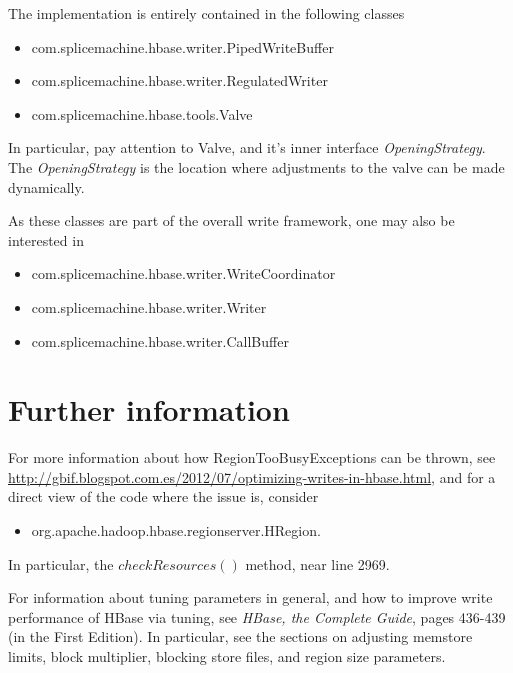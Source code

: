 \documentclass[11pt]{article}
\begin{document}
The implementation is entirely contained in the following classes

\begin{itemize}
\item com.splicemachine.hbase.writer.PipedWriteBuffer
\item com.splicemachine.hbase.writer.RegulatedWriter
\item com.splicemachine.hbase.tools.Valve
\end{itemize}

In particular, pay attention to Valve, and it's inner interface \emph{OpeningStrategy}. The \emph{OpeningStrategy} is the location where adjustments to the valve
can be made dynamically.

As these classes are part of the overall write framework, one may also be interested in 

\begin{itemize}
\item com.splicemachine.hbase.writer.WriteCoordinator
\item com.splicemachine.hbase.writer.Writer
\item com.splicemachine.hbase.writer.CallBuffer
\end{itemize}

\section{Further information}

For more information about how RegionTooBusyExceptions can be thrown, see \url{http://gbif.blogspot.com.es/2012/07/optimizing-writes-in-hbase.html}, and for
a direct view of the code where the issue is, consider 

\begin{itemize}
\item org.apache.hadoop.hbase.regionserver.HRegion.
\end{itemize}

In particular, the $checkResources()$ method, near line 2969.

For information about tuning parameters in general, and how to improve write performance of HBase via tuning, see \emph{HBase, the Complete Guide}, pages 
436-439 (in the First Edition). In particular, see the sections on adjusting memstore limits, block multiplier, blocking store files, and region size parameters.
\end{document}
